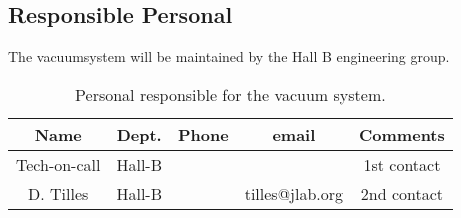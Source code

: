 \subsection{Responsible Personal}

\indent

The vacuumsystem will be maintained by the Hall B engineering group.  

 \begin{table}[!htb]
 \centering
 \begin{tabular}{|c|c|c|c|c|}
\hline
 Name&Dept.&Phone&email&Comments \\ \hline
 Tech-on-call & Hall-B&&& 1st contact  \\ \hline
 D. Tilles & Hall-B&&tilles@jlab.org&2nd contact \\ \hline
 \end{tabular}
\caption{ Personal responsible for the vacuum system.} 
\label{tb:beam}
\end{table}


